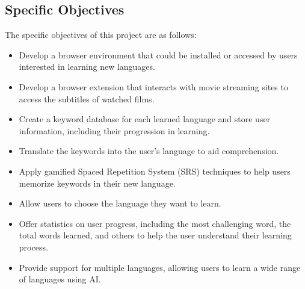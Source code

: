 \documentclass[12pt]{article}
\begin{document}
\subsection{Specific Objectives}

The specific objectives of this project are as follows:
\begin{itemize}
\item Develop a browser environment that could be installed or accessed by users interested in learning new languages.
\item Develop a browser extension that interacts with movie streaming sites to access the subtitles of watched films.
\item Create a keyword database for each learned language and store user information, including their progression in learning.
\item Translate the keywords into the user's language to aid comprehension.
\item Apply gamified Spaced Repetition System (SRS) techniques to help users memorize keywords in their new language.
\item Allow users to choose the language they want to learn.
\item Offer statistics on user progress, including the most challenging word, the total words learned, and others to help the user understand their learning process.
\item Provide support for multiple languages, allowing users to learn a wide range of languages using AI.
\end{itemize}
\end{document}
